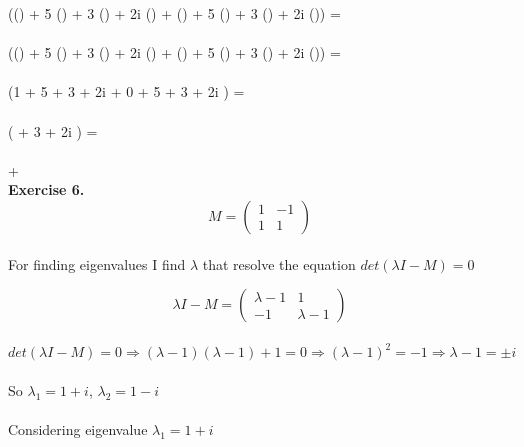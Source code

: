 \documentclass{article}
\DeclarePairedDelimiter\bra{\langle}{\rvert}
\DeclarePairedDelimiter\ket{\lvert}{\rangle}
\begin{document}
(() + 5 () + 3 () + 2i () + () + 5 () + 3 () + 2i ()) = \\\\
 (() + 5 () + 3 () + 2i () + () + 5 () + 3 () + 2i ()) = \\\\
 (1  + 5  + 3  + 2i  + 0 + 5  + 3  + 2i ) = \\\\
 ( + 3 + 2i ) = \\\\
  +  
\)
\pagebreak
\\
\textbf{Exercise 6.}\\

\[
M= \left( 
    \begin{array}{cc} 
        1 & -1 \\
        1 & 1
    \end{array} 
\right)
\]
\\
For finding eigenvalues I find \(\lambda\) that resolve the equation \(det\left(\lambda I - M \right) = 0\)

\[\lambda I - M = 
\left( 
    \begin{array}{cc} 
       \lambda - 1 & 1 \\
        -1 & \lambda - 1
    \end{array} 
\right)\]
\\

\[
det\left(\lambda I - M \right) = 0 \Rightarrow
(\lambda -1)(\lambda -1) + 1 = 0 \Rightarrow
(\lambda - 1)^2 = -1 \Rightarrow
\lambda - 1 = \pm i 
\]
\\
So \(\lambda_{1} = 1 + i\), \(\lambda_{2} = 1 - i\)
\\
\\
Considering eigenvalue \(\lambda_{1} = 1 + i\)
\end{document}
